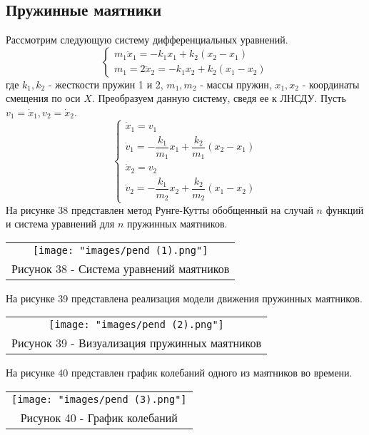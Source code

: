 \subsection{Пружинные маятники}
Рассмотрим следующую систему дифференциальных уравнений.
\begin{equation}
  \begin{cases}
    m_1\ddot{x}_1=-k_1x_1+k_2(x_2-x_1)\\
    m_1=2\ddot{x}_2=-k_1x_2+k_2(x_1-x_2)
  \end{cases}
\end{equation}
где $k_1,k_2$ - жесткости пружин 1 и 2, $m_1,m_2$ - массы пружин, $x_1,x_2$ - координаты смещения по оси $X$.
Преобразуем данную систему, сведя ее к ЛНСДУ. Пусть $v_1=\dot{x}_1,v_2=\dot{x}_2$.
\begin{equation}
  \begin{cases}
    \dot{x}_1=v_1\\
    \dot{v}_1=-\dfrac{k_1}{m_1}x_1+\dfrac{k_2}{m_1}(x_2-x_1)\\
    \dot{x}_2=v_2\\
    \dot{v}_2=-\dfrac{k_1}{m_2}x_2+\dfrac{k_2}{m_2}(x_1-x_2)
  \end{cases}
\end{equation}
На рисунке 38 представлен метод Рунге-Кутты обобщенный на случай $n$ функций и система уравнений для $n$ пружинных маятников.
\begin{center}
  \begin{tabular}{c}
  \texttt{[image: "images/pend (1).png"]}\\
  Рисунок 38 - Система уравнений маятников
\end{tabular}
\end{center}
На рисунке 39 представлена реализация модели движения пружинных маятников.
\begin{center}
  \begin{tabular}{c}
  \texttt{[image: "images/pend (2).png"]}\\
  Рисунок 39 - Визуализация пружинных маятников
\end{tabular}
\end{center}
На рисунке 40 представлен график колебаний одного из маятников во времени.
\begin{center}
  \begin{tabular}{c}
  \texttt{[image: "images/pend (3).png"]}\\
  Рисунок 40 - График колебаний
\end{tabular}
\end{center}


